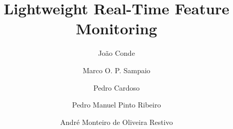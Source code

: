 \documentclass[sigconf]{acmart}
\begin{document}
%
\title{Lightweight Real-Time Feature Monitoring}

%

\author[Conde]{João Conde}

\author[Sampaio]{Marco O. P. Sampaio}

\author[Cardoso]{Pedro Cardoso}

\author[Ribeiro]{Pedro Manuel Pinto Ribeiro}

\author[Restivo]{André Monteiro de Oliveira Restivo}

%
\end{document}
